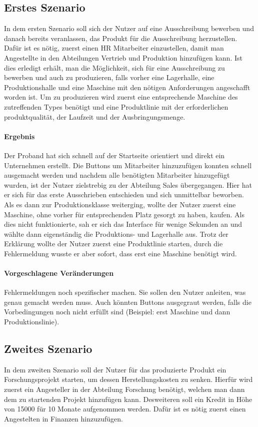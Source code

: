 \subsection{Erstes Szenario}
In dem ersten Szenario soll sich der Nutzer auf eine Ausschreibung bewerben und danach bereits veranlassen, das Produkt für die Ausschreibung herzustellen. Dafür ist es nötig, zuerst einen HR Mitarbeiter einzustellen, damit man Angestellte in den Abteilungen Vertrieb und Produktion hinzufügen kann. Ist dies erledigt erhält, man die Möglichkeit, sich für eine Ausschreibung zu bewerben und auch zu produzieren, falls vorher eine Lagerhalle, eine Produktionshalle und eine Maschine mit den nötigen Anforderungen angeschafft worden ist.
Um zu produzieren wird zuerst eine entsprechende Maschine des zutreffenden Types benötigt und eine Produktlinie mit der erforderlichen produktqualität, der Laufzeit und der Ausbringungsmenge.

\paragraph{Ergebnis}
Der Proband hat sich schnell auf der Startseite orientiert und direkt ein Unternehmen erstellt. Die Buttons um Mitarbeiter hinzuzufügen konnten schnell ausgemacht werden und nachdem alle benötigten Mitarbeiter hinzugefügt wurden, ist der Nutzer zielstrebig zu der Abteilung Sales übergegangen. Hier hat er sich für das erste Ausschrieben entschieden und sich unmittelbar beworben. Als es dann zur Produktionsklasse weiterging, wollte der Nutzer zuerst eine Maschine, ohne vorher für entsprechenden Platz gesorgt zu haben, kaufen.
Als dies nicht funktionierte, sah er sich das Interface für wenige Sekunden an und wählte dann eigenständig die Produktions- und Lagerhalle aus. Trotz der Erklärung wollte der Nutzer zuerst eine Produktlinie starten, durch die Fehlermeldung wusste er aber sofort, dass erst eine Maschine benötigt wird.

\paragraph{ Vorgeschlagene Veränderungen }
Fehlermeldungen noch spezifischer machen. Sie sollen den Nutzer anleiten, was genau gemacht werden muss. Auch könnten Buttons ausgegraut werden, falls die Vorbedingungen noch nicht erfüllt sind (Beispiel: erst Maschine und dann Produktionslinie).

\subsection{Zweites Szenario}
In dem zweiten Szenario soll der Nutzer für das produzierte Produkt ein Forschungsprojekt starten, um dessen Herstellungskosten zu senken. Hierfür wird zuerst ein Angesteller in der Abteilung Forschung benötigt, welchen man dann dem zu startenden Projekt hinzufügen kann. Desweiteren soll ein Kredit in Höhe von 15000 \€ für 10 Monate aufgenommen werden. Dafür ist es nötig zuerst einen Angestelten in Finanzen  hinzuzufügen.

